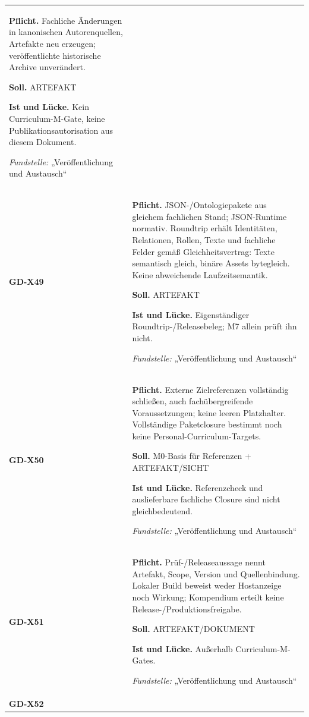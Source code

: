 \begin{longtable}{@{}P{20mm}P{128mm}@{}}
\textbf{Pflicht.} Fachliche Änderungen in kanonischen Autorenquellen, Artefakte neu erzeugen; veröffentlichte historische Archive unverändert.\par\smallskip
\textbf{Soll.} ARTEFAKT\par\smallskip
\textbf{Ist und Lücke.} Kein Curriculum-M-Gate, keine Publikationsautorisation aus diesem Dokument.\par\smallskip
\emph{Fundstelle:} „Veröffentlichung und Austausch“\\\addlinespace[5pt]
\label{rule:GD-X49}\textbf{GD-X49} &
\textbf{Pflicht.} JSON-/Ontologiepakete aus gleichem fachlichen Stand; JSON-Runtime normativ. Roundtrip erhält Identitäten, Relationen, Rollen, Texte und fachliche Felder gemäß Gleichheitsvertrag: Texte semantisch gleich, binäre Assets bytegleich. Keine abweichende Laufzeitsemantik.\par\smallskip
\textbf{Soll.} ARTEFAKT\par\smallskip
\textbf{Ist und Lücke.} Eigenständiger Roundtrip-/Releasebeleg; M7 allein prüft ihn nicht.\par\smallskip
\emph{Fundstelle:} „Veröffentlichung und Austausch“\\\addlinespace[5pt]
\label{rule:GD-X50}\textbf{GD-X50} &
\textbf{Pflicht.} Externe Zielreferenzen vollständig schließen, auch fachübergreifende Voraussetzungen; keine leeren Platzhalter. Vollständige Paketclosure bestimmt noch keine Personal-Curriculum-Targets.\par\smallskip
\textbf{Soll.} M0-Basis für Referenzen + ARTEFAKT/SICHT\par\smallskip
\textbf{Ist und Lücke.} Referenzcheck und auslieferbare fachliche Closure sind nicht gleichbedeutend.\par\smallskip
\emph{Fundstelle:} „Veröffentlichung und Austausch“\\\addlinespace[5pt]
\label{rule:GD-X51}\textbf{GD-X51} &
\textbf{Pflicht.} Prüf-/Releaseaussage nennt Artefakt, Scope, Version und Quellenbindung. Lokaler Build beweist weder Hostanzeige noch Wirkung; Kompendium erteilt keine Release-/Produktionsfreigabe.\par\smallskip
\textbf{Soll.} ARTEFAKT/DOKUMENT\par\smallskip
\textbf{Ist und Lücke.} Außerhalb Curriculum-M-Gates.\par\smallskip
\emph{Fundstelle:} „Veröffentlichung und Austausch“\\\addlinespace[5pt]
\label{rule:GD-X52}\textbf{GD-X52} &

\end{longtable}
